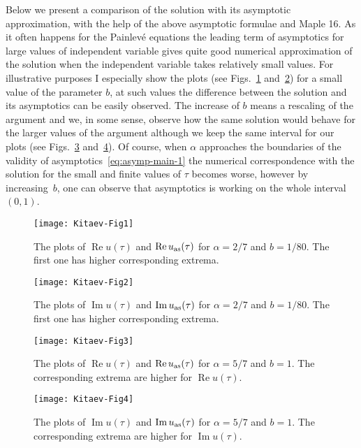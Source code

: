 \documentclass[pdftex]{sigma}
\numberwithin{equation}{section}
\begin{document}
Below we present a comparison of the solution with its asymptotic approximation, with the help of the
above asymptotic formulae and Maple 16. As it often happens for the Painlev\'e equations the leading term of
asymptotics for large values of independent variable gives quite good numerical approximation of the solution
when the independent variable takes relatively small values.
For illustrative purposes I especially show the plots
(see Figs.~\ref{fig:Re(u)alpha2d7b1d80} and~\ref{fig:Im(u)alpha2d7b1d80}) for a small value of
the parameter $b$, at such values the difference between the solution and its asymptotics can be easily observed.
The increase of $b$ means a rescaling of the argument and we, in some sense, observe how the same solution would
behave for the larger values of the argument although we keep the same interval for our plots
(see Figs.~\ref{fig:Re(u)alpha5d7b1} and~\ref{fig:Im(u)alpha5d7b1}). Of course, when $\alpha$ approaches the
boundaries of the validity of asymptotics~\eqref{eq:asymp-main-1} the numerical correspondence with the solution
for the small and finite values of $\tau$ becomes worse, however by increasing~$b$, one can observe that
asymptotics is working on the whole interval~$(0,1)$.
\begin{figure}[h!]\centering
\texttt{[image: Kitaev-Fig1]}
\caption{The plots of $\operatorname{Re}u(\tau)$ and $\operatorname{Re}u_{\rm as}(\tau)$ for $\alpha=2/7$ and $b=1/80$.
The first one has higher corresponding extrema.}\label{fig:Re(u)alpha2d7b1d80}
\end{figure}
\begin{figure}[h!]\centering
\texttt{[image: Kitaev-Fig2]}
\caption{The plots of $\operatorname{Im}u(\tau)$ and $\operatorname{Im}u_{\rm as}(\tau)$ for $\alpha=2/7$ and $b=1/80$.
The first one has higher corresponding extrema.}\label{fig:Im(u)alpha2d7b1d80}
\end{figure}

\begin{figure}[h!]\centering
\texttt{[image: Kitaev-Fig3]}
\caption{The plots of $\operatorname{Re}u(\tau)$ and $\operatorname{Re}u_{\rm as}(\tau)$ for $\alpha=5/7$ and $b=1$.
The corresponding extrema are higher for $\operatorname{Re}u(\tau)$.}\label{fig:Re(u)alpha5d7b1}
\end{figure}

\begin{figure}[h!]\centering
\texttt{[image: Kitaev-Fig4]}
\caption{The plots of $\operatorname{Im}u(\tau)$ and $\operatorname{Im}u_{\rm as}(\tau)$ for $\alpha=5/7$ and $b=1$.
The corresponding extrema are higher for $\operatorname{Im}u(\tau)$.}\label{fig:Im(u)alpha5d7b1}
\end{figure}
\end{document}
